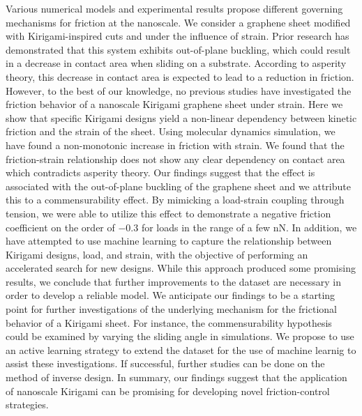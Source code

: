 Various numerical models and experimental results propose different governing
mechanisms for friction at the nanoscale. We consider a graphene sheet modified
with Kirigami-inspired cuts and under the influence of strain. Prior research
has demonstrated that this system exhibits out-of-plane buckling, which could
result in a decrease in contact area when sliding on a substrate. According to
asperity theory, this decrease in contact area is expected to lead to a
reduction in friction. However, to the best of our knowledge, no previous
studies have investigated the friction behavior of a nanoscale Kirigami graphene
sheet under strain. Here we show that specific Kirigami designs yield a
non-linear dependency between kinetic friction and the strain of the sheet.
Using molecular dynamics simulation, we have found a non-monotonic increase in
friction with strain. We found that the friction-strain relationship does not
show any clear dependency on contact area which contradicts asperity theory. Our
findings suggest that the effect is associated with the out-of-plane buckling of
the graphene sheet and we attribute this to a commensurability effect. By
mimicking a load-strain coupling through tension, we were able to utilize this
effect to demonstrate a negative friction coefficient on the order of $-0.3$ for
loads in the range of a few nN. In addition, we have attempted to use machine
learning to capture the relationship between Kirigami designs, load, and strain,
with the objective of performing an accelerated search for new designs. While
this approach produced some promising results, we conclude that further
improvements to the dataset are necessary in order to develop a reliable model.
We anticipate our findings to be a starting point for further investigations of
the underlying mechanism for the frictional behavior of a Kirigami sheet. For
instance, the commensurability hypothesis could be examined by varying the
sliding angle in simulations. We propose to use an active learning strategy to
extend the dataset for the use of machine learnig to assist these
investigations. If successful, further studies can be done on the method of
inverse design. In summary, our findings suggest that the application of
nanoscale Kirigami can be promising for developing novel friction-control
strategies.